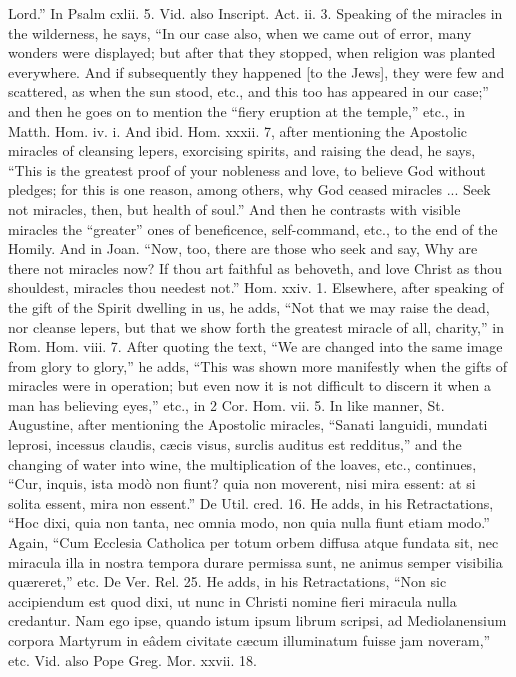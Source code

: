 {Lord.'' In Psalm cxlii. 5. Vid. also Inscript. Act. ii. 3. Speaking of
the miracles in the wilderness, he says, ``In our case also, when we
came out of error, many wonders were displayed; but after that they
stopped, when religion was planted everywhere. And if subsequently
they happened [to the Jews], they were few and scattered, as when the
sun stood, etc., and this too has appeared in our case;'' and then he
goes on to mention the ``fiery eruption at the temple,'' etc., in Matth.
Hom. iv. i. And ibid. Hom. xxxii. 7, after mentioning the Apostolic
miracles of cleansing lepers, exorcising spirits, and raising the
dead, he says, ``This is the greatest proof of your nobleness and love,
to believe God without pledges; for this is one reason, among others,
why God ceased miracles ... Seek not miracles, then, but health of
soul.'' And then he contrasts with visible miracles the ``greater'' ones
of beneficence, self-command, etc., to the end of the Homily. And in
Joan. ``Now, too, there are those who seek and say, Why are there not
miracles now? If thou art faithful as behoveth, and love Christ as
thou shouldest, miracles thou needest not.'' Hom. xxiv. 1. Elsewhere,
after speaking of the gift of the Spirit dwelling in us, he adds, ``Not
that we may raise the dead, nor cleanse lepers, but that we show forth
the greatest miracle of all, charity,'' in Rom. Hom. viii. 7. After
quoting the text, ``We are changed into the same image from glory to
glory,'' he adds, ``This was shown more manifestly when the gifts of
miracles were in operation; but even now it is not difficult to
discern it when a man has believing eyes,'' etc., in 2 Cor. Hom. vii.
5. In like manner, St. Augustine, after mentioning the Apostolic
miracles, ``Sanati languidi, mundati leprosi, incessus claudis, cæcis
visus, surclis auditus est redditus,'' and the changing of water into
wine, the multiplication of the loaves, etc., continues, ``Cur, inquis,
ista modò non fiunt? quia non moverent, nisi mira essent: at si
solita essent, mira non essent.'' De Util. cred. 16. He adds, in his
Retractations, ``Hoc dixi, quia non tanta, nec omnia modo, non quia
nulla fiunt etiam modo.'' Again, ``Cum Ecclesia Catholica per totum
orbem diffusa atque fundata sit, nec miracula illa in nostra tempora
durare permissa sunt, ne animus semper visibilia quæreret,'' etc. De
Ver. Rel. 25. He adds, in his Retractations, ``Non sic accipiendum est
quod dixi, ut nunc in Christi nomine fieri miracula nulla credantur.
Nam ego ipse, quando istum ipsum librum scripsi, ad Mediolanensium
corpora Martyrum in eâdem civitate cæcum illuminatum fuisse jam
noveram,'' etc. Vid. also Pope Greg. Mor. xxvii. 18.}

